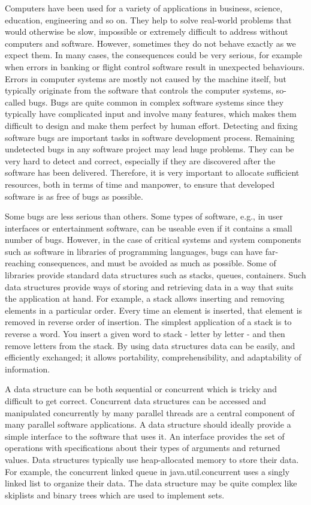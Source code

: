 
Computers have been used for a variety of applications in business, science, education, engineering and so on. They help to solve real-world problems that would otherwise be slow, impossible or extremely difficult to address without computers and software. However, sometimes they do not behave exactly as we expect them. In many cases, the consequences could be very serious, for example when errors in banking or flight control software result in unexpected behaviours. Errors in computer systems are mostly not caused by the machine itself, but typically originate from the software that controls the computer systems, so-called bugs. Bugs are quite common in complex software systems since they typically have complicated input and involve many features, which makes them difficult to design and make them perfect by human effort. Detecting and fixing software bugs are important tasks in software development process. Remaining undetected bugs in any software project may lead huge problems. They can be very hard to detect and correct, especially if they are discovered after the software has been delivered. Therefore, it is very important to allocate sufficient resources, both in terms of time and manpower, to ensure that developed software is as free of bugs as possible. 

Some bugs are less serious than others. Some types of software, e.g., in user interfaces or entertainment software, can be useable even if it contains a small number of bugs.
However, in the case of critical systems and system components such as software in libraries of programming languages, 
bugs can have far-reaching consequences, and must be avoided as much as possible.
Some of libraries provide standard data structures such as stacks, queues, containers. Such data structures provide ways of storing  
and retrieving data in a way that suits the application at hand. For example, a stack allows inserting and removing elements in a particular order. Every time an element is inserted, that element is removed
in reverse order of insertion. The simplest application of a stack is to reverse a word. You insert a given word to stack - letter by letter - and then remove letters from the stack.
By using data structures data can be easily, and efficiently exchanged; it allows portability, comprehensibility, and adaptability of information.

A data structure can be both sequential or concurrent which is tricky and difficult to get correct. Concurrent data structures can be accessed and manipulated concurrently by many parallel threads are a central component of many parallel software applications. A data structure should ideally provide a simple interface to the software that uses it. An interface provides the set of operations with specifications about their types of arguments and returned values. Data structures typically use heap-allocated memory to store their data. For example, the concurrent linked queue in java.util.concurrent uses a singly linked list to organize their data. The data structure may be quite complex like skiplists and binary trees which are used to implement sets.

